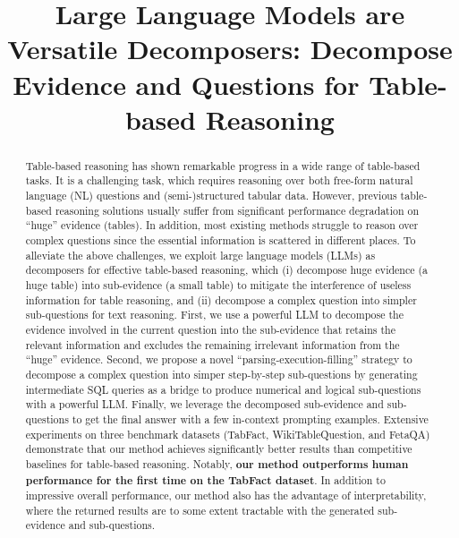 \title{Large Language Models are Versatile Decomposers: Decompose Evidence and Questions for Table-based Reasoning}



\maketitle

\renewcommand{\thefootnote}{\fnsymbol{footnote}}

\begin{abstract}
Table-based reasoning has shown remarkable progress in a wide range of table-based tasks.
It is a challenging task, which requires reasoning over both free-form natural language (NL) questions and (semi-)structured tabular data. However, previous table-based reasoning solutions usually suffer from significant performance degradation on ``huge'' evidence (tables). In addition, most existing methods struggle to reason over complex questions since the essential information is scattered in different places. To alleviate the above challenges, we exploit large language models (LLMs) as decomposers for effective table-based reasoning, which (i) decompose huge evidence (a huge table) into sub-evidence (a small table) to mitigate the interference of useless information for table reasoning, and (ii) decompose a complex question into simpler sub-questions for text reasoning. First, we use a powerful LLM to decompose the evidence involved in the current question into the sub-evidence that retains the relevant information and excludes the remaining irrelevant information from the ``huge'' evidence. 
Second, we propose a novel ``parsing-execution-filling'' strategy to decompose a complex question into simper step-by-step sub-questions by generating intermediate SQL queries as a bridge to produce numerical and logical sub-questions with a powerful LLM.
Finally, we leverage the decomposed sub-evidence and sub-questions to get the final answer with a few in-context prompting examples. 
Extensive experiments on three benchmark datasets (TabFact, WikiTableQuestion, and FetaQA) demonstrate that our method achieves significantly better results than competitive baselines for table-based reasoning. 
Notably, \textbf{our method outperforms human performance for the first time on the TabFact dataset}. In addition to impressive overall performance, our method also has the advantage of interpretability, where the returned results are to some extent tractable with the generated sub-evidence and sub-questions.
\end{abstract}

